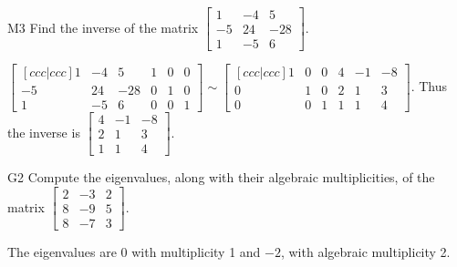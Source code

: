 \documentclass{sbgLAquiz}
\begin{document}
\begin{extract}\newpage\end{extract}
\begin{problem}{M3}
  Find the inverse of the matrix
  \(\begin{bmatrix}
    1 & -4 & 5  \\
    -5 & 24 & -28  \\
    1 & -5 & 6
  \end{bmatrix}\).
\end{problem}
\begin{solution}
\(\begin{bmatrix}[ccc|ccc]
  1 & -4 & 5 & 1 & 0 & 0  \\
  -5 & 24 & -28 & 0 & 1 & 0 \\
  1 & -5 & 6 & 0 & 0 & 1
\end{bmatrix}\sim\begin{bmatrix}[ccc|ccc]
  1 & 0 & 0 & 4 & -1 & -8  \\
  0 & 1 & 0 & 2 & 1 & 3  \\
  0 & 0 & 1 & 1 & 1 & 4
\end{bmatrix}\). Thus the inverse is
\(\begin{bmatrix}
  4 & -1 & -8  \\
  2 & 1 & 3  \\
  1 & 1 & 4
\end{bmatrix}\).
\end{solution}


\begin{problem}{G2} 
Compute the eigenvalues, along with their algebraic multiplicities, of the matrix $ \begin{bmatrix}2 & -3 & 2 \\ 8 & -9 & 5 \\ 8 & -7 & 3 \end{bmatrix}$.
\end{problem}
\begin{solution}
The eigenvalues are $0$ with multiplicity 1 and $-2$, with algebraic multiplicity 2.
\end{solution}
\end{document}
